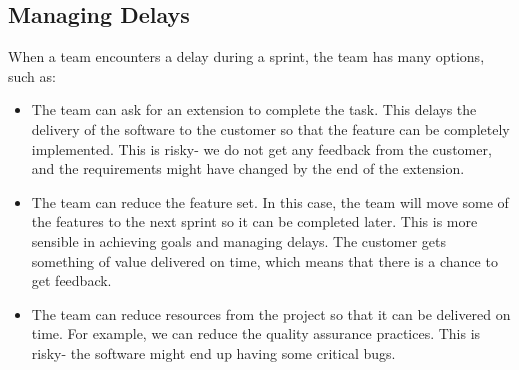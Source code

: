 \documentclass[a4paper, openany]{memoir}
\begin{document}
\subsection{Managing Delays}
When a team encounters a delay during a sprint, the team has many options, such as:
\begin{itemize}
    \item The team can ask for an extension to complete the task. This delays the delivery of the software to the customer so that the feature can be completely implemented. This is risky- we do not get any feedback from the customer, and the requirements might have changed by the end of the extension.
    \item The team can reduce the feature set. In this case, the team will move some of the features to the next sprint so it can be completed later. This is more sensible in achieving goals and managing delays. The customer gets something of value delivered on time, which means that there is a chance to get feedback.
    
    \item The team can reduce resources from the project so that it can be delivered on time. For example, we can reduce the quality assurance practices. This is risky- the software might end up having some critical bugs.
\end{itemize}
\end{document}
